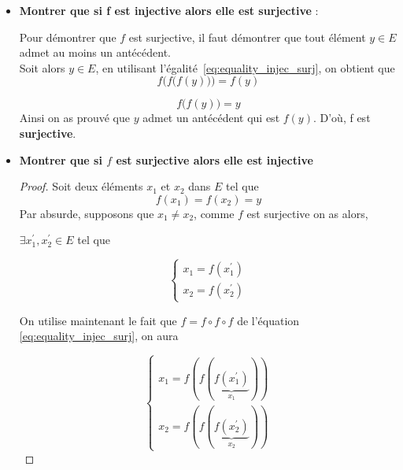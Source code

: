 \documentclass[12pt,a4paper,dvipsnames]{article}
\begin{document}
\begin{itemize}
    \item \textbf{Montrer que si f est injective alors elle est surjective} :

        Pour démontrer que $f$ est surjective, il faut démontrer que tout
        élément $y\in E$ admet au moins un antécédent.\\

        Soit alors $y\in E$, en utilisant l'égalité~\eqref{eq:equality_injec_surj}, on
        obtient que 
        \begin{equation}
            f\Big(f\big(f(y)\big)\Big) = f(y)
        \end{equation}

        \begin{equation}
            \label{eq:found_ant} 
            f\big(f(y)\big) = y
        \end{equation}
        Ainsi on as prouvé que $y$ admet un antécédent qui est $f(y)$.
        D'où, f est \textbf{surjective}.

    \item \textbf{Montrer que si $f$ est surjective alors elle est injective} 

\begin{proof}
  Soit deux éléments $x_1$ et $x_2$ dans $E$ tel que
  \begin{equation}
    \label{eq:equality}
    f(x_1) = f(x_2)=y
  \end{equation}
  Par absurde, supposons que $x_1 \neq x_2$, comme $f$ est surjective on as alors,

  $\exists x_1^{'}, x_2^{'}\in E$ tel que

  \begin{equation*}
    \left\{\begin{array}{l}
        x_1 = f(x_1^{'})\\[4pt]
      x_2 = f(x_2^{'})
    \end{array}
    \right.
  \end{equation*}

  On utilise maintenant le fait que $f=f\circ f \circ f$ de l'équation
  \eqref{eq:equality_injec_surj}, on aura

  \begin{equation*}
    \left\{\begin{array}{l}
        x_1 = f(f(\underbrace{f(x_1^{'})}_{x_1}))\\[10pt]
        x_2 = f(f(\underbrace{f(x_2^{'})}_{x_2}))
    \end{array}
    \right.
  \end{equation*}


\end{proof}
\end{itemize}
\end{document}
